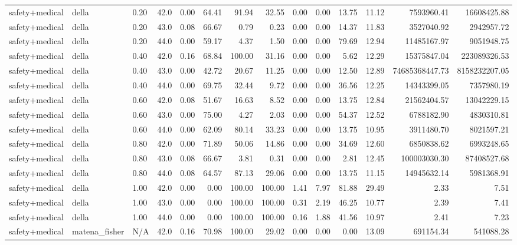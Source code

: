 \documentclass{article}
\begin{document}
\begin{table}[H]
{\begin{tabular}{llllrrrrrrrrrr}
safety+medical & della & 0.20 & 42.0 & 0.00 & 64.41 & 91.94 & 32.55 & 0.00 & 0.00 & 13.75 & 11.12 & 7593960.41 & 16608425.88 \\
safety+medical & della & 0.20 & 43.0 & 0.08 & 66.67 & 0.79 & 0.23 & 0.00 & 0.00 & 14.37 & 11.83 & 3527040.92 & 2942957.72 \\
safety+medical & della & 0.20 & 44.0 & 0.00 & 59.17 & 4.37 & 1.50 & 0.00 & 0.00 & 79.69 & 12.94 & 11485167.97 & 9051948.75 \\
safety+medical & della & 0.40 & 42.0 & 0.16 & 68.84 & 100.00 & 31.16 & 0.00 & 0.00 & 5.62 & 12.29 & 15375847.04 & 223089326.53 \\
safety+medical & della & 0.40 & 43.0 & 0.00 & 42.72 & 20.67 & 11.25 & 0.00 & 0.00 & 12.50 & 12.89 & 74685368447.73 & 8158232207.05 \\
safety+medical & della & 0.40 & 44.0 & 0.00 & 69.75 & 32.44 & 9.72 & 0.00 & 0.00 & 36.56 & 12.25 & 14343399.05 & 7357980.19 \\
safety+medical & della & 0.60 & 42.0 & 0.08 & 51.67 & 16.63 & 8.52 & 0.00 & 0.00 & 13.75 & 12.84 & 21562404.57 & 13042229.15 \\
safety+medical & della & 0.60 & 43.0 & 0.00 & 75.00 & 4.27 & 2.03 & 0.00 & 0.00 & 54.37 & 12.52 & 6788182.90 & 4830310.81 \\
safety+medical & della & 0.60 & 44.0 & 0.00 & 62.09 & 80.14 & 33.23 & 0.00 & 0.00 & 13.75 & 10.95 & 3911480.70 & 8021597.21 \\
safety+medical & della & 0.80 & 42.0 & 0.00 & 71.89 & 50.06 & 14.86 & 0.00 & 0.00 & 34.69 & 12.60 & 6850838.62 & 6993248.65 \\
safety+medical & della & 0.80 & 43.0 & 0.08 & 66.67 & 3.81 & 0.31 & 0.00 & 0.00 & 2.81 & 12.45 & 100003030.30 & 87408527.68 \\
safety+medical & della & 0.80 & 44.0 & 0.08 & 64.57 & 87.13 & 29.06 & 0.00 & 0.00 & 13.75 & 11.15 & 14945632.14 & 5981368.91 \\
safety+medical & della & 1.00 & 42.0 & 0.00 & 0.00 & 100.00 & 100.00 & 1.41 & 7.97 & 81.88 & 29.49 & 2.33 & 7.51 \\
safety+medical & della & 1.00 & 43.0 & 0.00 & 0.00 & 100.00 & 100.00 & 0.31 & 2.19 & 46.25 & 10.77 & 2.39 & 7.41 \\
safety+medical & della & 1.00 & 44.0 & 0.00 & 0.00 & 100.00 & 100.00 & 0.16 & 1.88 & 41.56 & 10.97 & 2.41 & 7.23 \\
safety+medical & matena\_fisher & N/A & 42.0 & 0.16 & 70.98 & 100.00 & 29.02 & 0.00 & 0.00 & 0.00 & 13.09 & 691154.34 & 541088.28 \\

\end{tabular}}
\end{table}
\end{document}
